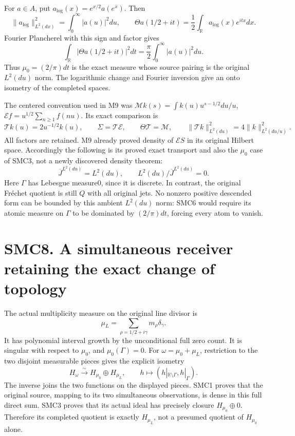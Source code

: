 For \(a\in A\), put \(a_{\log}(x)=e^{x/2}a(e^x)\). Then \[
\|a_{\log}\|_{L^2(dx)}^2=\int_0^\infty|a(u)|^2du,
\qquad
\Theta a(1/2+it)=\frac12\int_{\mathbb R}a_{\log}(x)e^{itx}dx.
\tag{SMC7.1}
\] Fourier Plancherel with this sign and factor gives \[
\int_{\mathbb R}|\Theta a(1/2+it)|^2dt
=\frac\pi2\int_0^\infty|a(u)|^2du.
\tag{SMC7.2}
\] Thus \(\mu_0=(2/\pi)dt\) is the exact measure whose source pairing is
the original \(L^2(du)\) norm. The logarithmic change and Fourier
inversion give an onto isometry of the completed spaces.

The centered convention used in M9 was
\(\mathcal M k(s)=\int k(u)u^{s-1/2}du/u\),
\(\mathcal E f=u^{1/2}\sum_{n\ge1}f(nu)\). Its exact comparison is \[
\mathcal T k(u)=2u^{-1/2}k(u),\qquad
\Sigma=\mathcal T\mathcal E,\qquad
\Theta\mathcal T=\mathcal M,\qquad
\|\mathcal T k\|_{L^2(du)}^2=4\|k\|_{L^2(du/u)}^2.
\tag{SMC7.3}
\] All factors are retained. M9 already proved density of
\(\mathcal E S\) in its original Hilbert space. Accordingly the
following is its proved exact transport and also the \(\mu_0\) case of
SMC3, not a newly discovered density theorem: \[
\overline J^{L^2(du)}=L^2(du),\qquad
L^2(du)/\overline J^{L^2(du)}=0.
\tag{SMC7.4}
\] Here \(\Gamma\) has Lebesgue measure0, since it is discrete. In
contrast, the original Fréchet quotient is still \(Q\) with all original
jets. No nonzero positive descended form can be bounded by this ambient
\(L^2(du)\) norm: SMC6 would require its atomic measure on \(\Gamma\) to
be dominated by \((2/\pi)dt\), forcing every atom to vanish.

\section{SMC8. A simultaneous receiver retaining the exact change of
topology}\label{smc8.-a-simultaneous-receiver-retaining-the-exact-change-of-topology}

The actual multiplicity measure on the original line divisor is \[
\mu_L=\sum_{\rho=1/2+i\gamma}m_\rho\delta_\gamma.
\tag{SMC8.1}
\] It has polynomial interval growth by the unconditional full zero
count. It is singular with respect to \(\mu_0\), and
\(\mu_0(\Gamma)=0\). For \(\omega=\mu_0+\mu_L\), restriction to the two
disjoint measurable pieces gives the explicit isometry \[
H_\omega\xrightarrow{\sim}H_{\mu_0}\oplus H_{\mu_L},
\qquad h\longmapsto(h|_{\mathbb R\setminus\Gamma},h|_\Gamma).
\tag{SMC8.2}
\] The inverse joins the two functions on the displayed pieces. SMC1
proves that the original source, mapping to its two simultaneous
observations, is dense in this full direct sum. SMC3 proves that its
actual ideal has precisely closure \(H_{\mu_0}\oplus0\). Therefore its
completed quotient is exactly \(H_{\mu_L}\), not a presumed quotient of
\(H_{\mu_0}\) alone.

